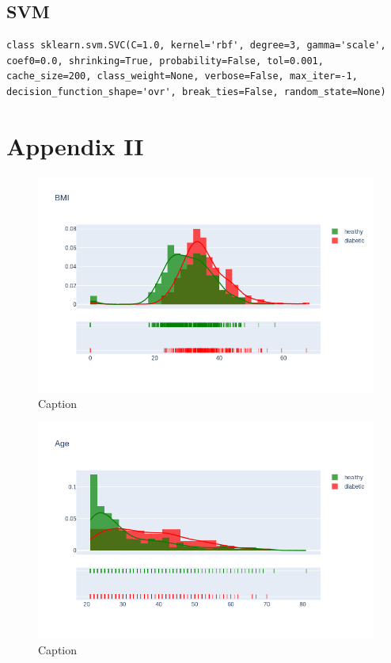 \documentclass[12pt]{article}
\begin{document}
\subsection{SVM}
\begin{lstlisting}
class sklearn.svm.SVC(C=1.0, kernel='rbf', degree=3, gamma='scale', coef0=0.0, shrinking=True, probability=False, tol=0.001, cache_size=200, class_weight=None, verbose=False, max_iter=-1, decision_function_shape='ovr', break_ties=False, random_state=None)
\end{lstlisting}
\clearpage

\section{Appendix II}

\begin{figure}[ht]
\centering
\includegraphics[width=1\textwidth]{10.png}
\caption{\label{fig:1} Caption}
\end{figure}

\begin{figure}[ht]
\centering
\includegraphics[width=1\textwidth]{11.png}
\caption{\label{fig:2} Caption}
\end{figure}
\end{document}

